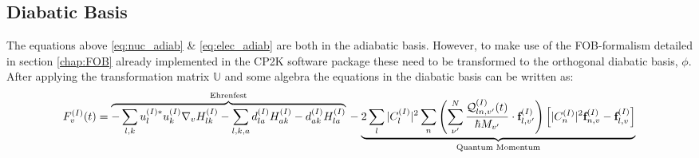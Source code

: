 \subsection{Diabatic Basis}
The equations above \eqref{eq:nuc_adiab} \& \eqref{eq:elec_adiab} are both in the adiabatic basis. However, to make use of the FOB-formalism detailed in section \ref{chap:FOB} already implemented in the CP2K software package \cite{CP2K} these need to be transformed to the orthogonal diabatic basis, $\phi$. After applying the transformation matrix $\mathbb{U}$ and some algebra the equations in the diabatic basis can be written as:
\begin{dmath}
{ F_{v}^{(I)}(t)} =
\overbrace{ -\sum_{l,k} u_{l}^{(I) *} u_{k}^{(I)} \nabla_{v} H_{lk}^{(I)} - \sum_{l,k,a} d_{la}^{(I)}H_{ak}^{(I)} - d_{ak}^{(I)}H_{la}^{(I)}}^{\text{Ehrenfest}}
\\
 - \underbrace{2 \sum_{l} |C_{l}^{(I)}|^2 \sum_{n} \left( \sum^{N}_{\nu'} \frac{\mathcal{Q}^{(I)}_{ln,v'}(t)}{\hbar M_{v'}} \cdot \textbf{f}^{(I)}_{l,v'}\right)\left[  |C_{n}^{(I)}|^{2} \textbf{f}^{(I)}_{n,v} - \textbf{f}^{(I)}_{l,v} \right]}_{\text{Quantum Momentum}}
 \label{eq:diab_force}
\end{dmath}


